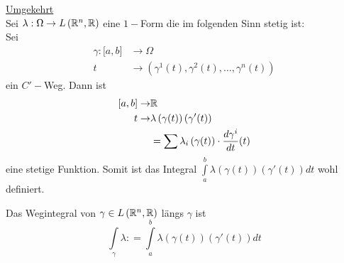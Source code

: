 \noindent\underline{Umgekehrt}\\

\noindent Sei $\lambda :\Omega\to L\left( \mathbb{R}^n,\mathbb{R}\right)$ eine $1-$Form die im folgenden Sinn stetig ist: \\

Sei
\begin{align*}
\gamma :\lbrack a,b\rbrack &\to\Omega\\
t &\to\left( \gamma^1 (t), \gamma^2 (t),\dots ,\gamma^n (t) \right)
\end{align*}
ein $C'-$Weg. Dann ist
\begin{align*}
\lbrack a,b\rbrack \to &\mathbb{R}\\
t\to &\lambda\left( \gamma (t)\right)\left( \gamma' (t)\right)\\
& = \sum{\lambda_i\left(\gamma(t)\right)\cdot\frac{d\gamma^i}{dt}(t)}
\end{align*}
eine stetige Funktion. Somit ist das Integral $\int\limits_a^b {\lambda \left( {\gamma \left( t \right)} \right)\left( {\gamma '\left( t \right)} \right)dt} $ wohl definiert.

\begin{definition}{8.36}
Das Wegintegral von $\gamma\in L\left( \mathbb{R}^n,\mathbb{R}\right)$ längs $\gamma$ ist \[\int\limits_\gamma  \lambda  : = \int\limits_a^b {\lambda \left( {\gamma (t)} \right)\left( {\gamma '(t)} \right)dt} \]
\end{definition}

